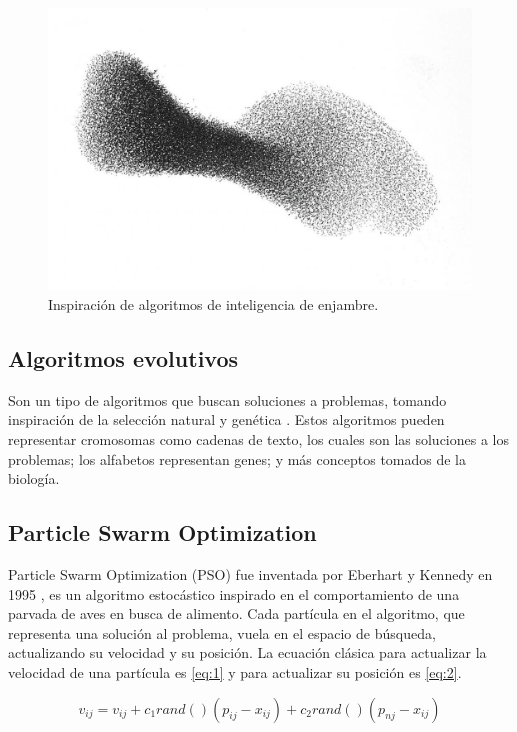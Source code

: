 \documentclass[letterpaper]{report}
\begin{document}
    \begin{figure}[ht!]
      \includegraphics[scale=0.18]{si-repr}
      \centering
      \caption{Inspiración de algoritmos de inteligencia de enjambre.}
      \centering
    \end{figure}

  \subsection{Algoritmos evolutivos}
    Son un tipo de algoritmos que buscan soluciones a problemas, tomando
    inspiración de la selección natural y genética \cite{EADef,GADef}. Estos 
    algoritmos pueden representar cromosomas como cadenas de texto, los cuales 
    son las soluciones a los problemas; los alfabetos representan genes; y más
    conceptos tomados de la biología.

  \subsection{Particle Swarm Optimization}\label{subsec:pso}
    Particle Swarm Optimization (PSO) fue inventada por Eberhart y Kennedy en
    1995 \cite{PSODef}, es un algoritmo
    estocástico inspirado en el comportamiento de una parvada de aves en busca
    de alimento. Cada partícula en el algoritmo, que representa una solución al
    problema, vuela en el espacio de búsqueda, actualizando su velocidad y su
    posición. La ecuación clásica para actualizar la velocidad de una partícula
    es \ref{eq:1} y para actualizar su posición es \ref{eq:2}.

    \begin{equation}
      \label{eq:1}
      v_{ij} = v_{ij} + c_1 rand()(p_{ij} - x_{ij}) + c_2 rand()(p_{nj} - x_{ij})
    \end{equation}
\end{document}
